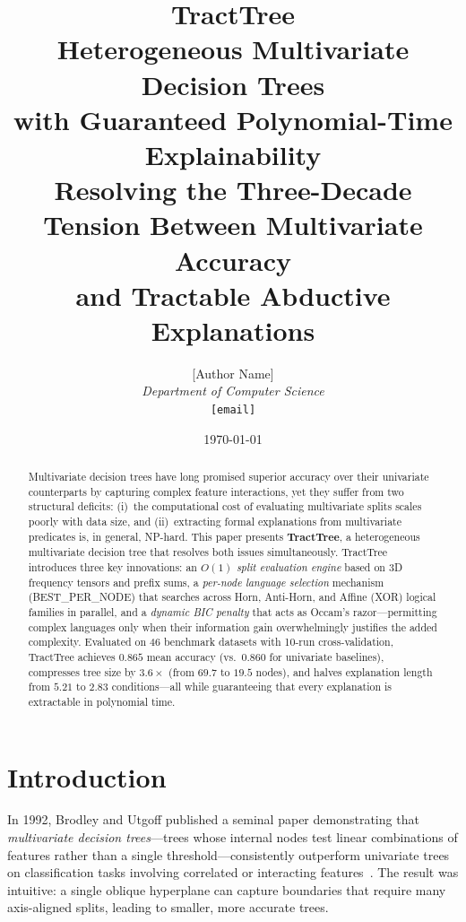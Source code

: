 \documentclass[11pt,a4paper]{article}
\title{%
  \textbf{\Huge TractTree}\\[0.6em]
  \Large Heterogeneous Multivariate Decision Trees\\
  with Guaranteed Polynomial-Time Explainability\\[0.4em]
  \normalsize\textcolor{tractgray}{%
    Resolving the Three-Decade Tension Between Multivariate Accuracy\\
    and Tractable Abductive Explanations}
}
\author{[Author Name]\\
  \textit{Department of Computer Science}\\
  \texttt{[email]}
}
\date{\today}
\begin{document}
\maketitle

\begin{abstract}
Multivariate decision trees have long promised superior accuracy over their univariate counterparts by capturing complex feature interactions, yet they suffer from two structural deficits: (i)~the computational cost of evaluating multivariate splits scales poorly with data size, and (ii)~extracting formal explanations from multivariate predicates is, in general, NP-hard. This paper presents \textbf{TractTree}, a heterogeneous multivariate decision tree that resolves both issues simultaneously. TractTree introduces three key innovations: an \emph{$O(1)$ split evaluation engine} based on 3D frequency tensors and prefix sums, a \emph{per-node language selection} mechanism (BEST\_PER\_NODE) that searches across Horn, Anti-Horn, and Affine (XOR) logical families in parallel, and a \emph{dynamic BIC penalty} that acts as Occam's razor---permitting complex languages only when their information gain overwhelmingly justifies the added complexity. Evaluated on 46 benchmark datasets with 10-run cross-validation, TractTree achieves $0.865$ mean accuracy (vs.\ $0.860$ for univariate baselines), compresses tree size by $3.6\times$ (from $69.7$ to $19.5$ nodes), and halves explanation length from $5.21$ to $2.83$ conditions---all while guaranteeing that every explanation is extractable in polynomial time.
\end{abstract}

\vspace{0.5cm}

\section{Introduction}

In 1992, Brodley and Utgoff published a seminal paper demonstrating that \emph{multivariate decision trees}---trees whose internal nodes test linear combinations of features rather than a single threshold---consistently outperform univariate trees on classification tasks involving correlated or interacting features~\cite{brodley1992}. The result was intuitive: a single oblique hyperplane can capture boundaries that require many axis-aligned splits, leading to smaller, more accurate trees.
\end{document}
